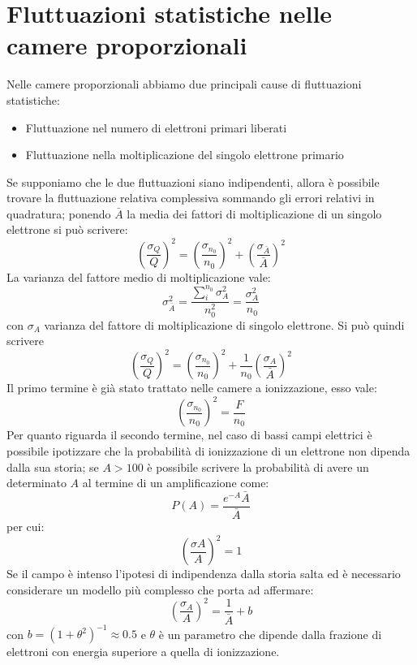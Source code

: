 \section{Fluttuazioni statistiche nelle camere proporzionali}
Nelle camere proporzionali abbiamo due principali cause di fluttuazioni statistiche:
\begin{itemize}
\item Fluttuazione nel numero di elettroni primari liberati
\item Fluttuazione nella moltiplicazione del singolo elettrone primario
\end{itemize}
Se supponiamo che le due fluttuazioni siano indipendenti, allora \`e possibile trovare la fluttuazione relativa complessiva sommando gli errori relativi in quadratura;
ponendo $\bar{A}$ la media dei fattori di moltiplicazione di un singolo elettrone si pu\`o scrivere:
\begin{equation*}
\left(\frac{\sigma_{Q}}{Q}\right)^2 = \left(\frac{\sigma_{n_0}}{n_0}\right)^2 +  \left(\frac{\sigma_{\bar{A}}}{\bar{A}}\right)^2
\end{equation*}
La varianza del fattore medio di moltiplicazione vale:
\begin{equation*}
\sigma^2_{\bar{A}} = \frac{\sum_i^{n_0} \sigma^2_A}{n_0^2} = \frac{\sigma^2_A}{n_0}
\end{equation*}
con $\sigma_A$ varianza del fattore di moltiplicazione di singolo elettrone.
Si pu\`o quindi scrivere
\begin{equation*}
\left(\frac{\sigma_{Q}}{Q}\right)^2 = \left(\frac{\sigma_{n_0}}{n_0}\right)^2 + \frac{1}{n_0} \left(\frac{\sigma_{A}}{\bar{A}}\right)^2
\end{equation*}
Il primo termine \`e gi\`a stato trattato nelle camere a ionizzazione, esso vale:
\begin{equation*}
\left(\frac{\sigma_{n_0}}{n_0}\right)^2 = \frac{F}{n_0}
\end{equation*}
Per quanto riguarda il secondo termine, nel caso di bassi campi elettrici \`e possibile ipotizzare che la probabilit\`a di ionizzazione di un elettrone non dipenda dalla sua storia;
se $A>100$ \`e possibile scrivere la probabilit\`a di avere un determinato $A$ al termine di un amplificazione come:
\begin{equation*}
P(A) = \frac{e^{-A}{\bar{A}}}{\bar{A}}
\end{equation*} 
per cui:
\begin{equation*}
\left(\frac{\sigma{A}}{A}\right)^2 = 1
\end{equation*}
Se il campo \`e intenso l'ipotesi di indipendenza dalla storia salta ed \`e necessario considerare un modello pi\`u complesso che porta ad affermare:
\begin{equation*}
\left(\frac{\sigma_A}{A}\right)^2 = \frac{1}{\bar{A}} + b
\end{equation*}
con $b = (1+\theta^2)^{-1}\approx 0.5$ e $\theta$ \`e un parametro che dipende dalla frazione di elettroni con energia superiore a quella di ionizzazione.
